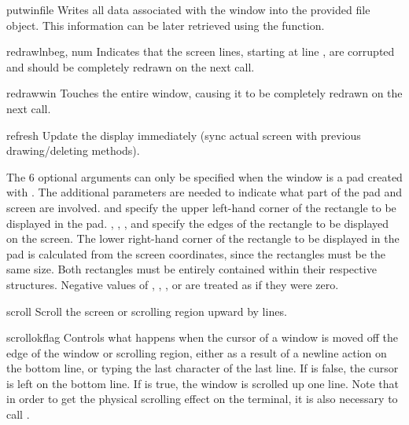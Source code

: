 \begin{methoddesc}{putwin}{file}
Writes all data associated with the window into the provided file
object.  This information can be later retrieved using the
 function.

\end{methoddesc}

\begin{methoddesc}{redrawln}{beg, num}
Indicates that the  screen lines, starting at line ,
are corrupted and should be completely redrawn on the next
 call.
\end{methoddesc}

\begin{methoddesc}{redrawwin}{}
Touches the entire window, causing it to be completely redrawn on the
next  call.
\end{methoddesc}

\begin{methoddesc}{refresh}{}
Update the display immediately (sync actual screen with previous
drawing/deleting methods).

The 6 optional arguments can only be specified when the window is a
pad created with .  The additional parameters are
needed to indicate what part of the pad and screen are involved.
 and  specify the upper left-hand corner of the
rectangle to be displayed in the pad.  , ,
, and  specify the edges of the rectangle to
be displayed on the screen.  The lower right-hand corner of the
rectangle to be displayed in the pad is calculated from the screen
coordinates, since the rectangles must be the same size.  Both
rectangles must be entirely contained within their respective
structures.  Negative values of , ,
, or  are treated as if they were zero.
\end{methoddesc}

\begin{methoddesc}{scroll}{}
Scroll the screen or scrolling region upward by  lines.
\end{methoddesc}

\begin{methoddesc}{scrollok}{flag}
Controls what happens when the cursor of a window is moved off the
edge of the window or scrolling region, either as a result of a
newline action on the bottom line, or typing the last character
of the last line.  If  is false, the cursor is left
on the bottom line.  If  is true, the window is
scrolled up one line.  Note that in order to get the physical
scrolling effect on the terminal, it is also necessary to call
.
\end{methoddesc}

